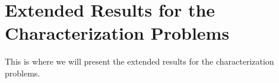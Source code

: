 \section{Extended Results for the Characterization Problems}
\label{sec:extendedcharprobs}

This is where we will present the extended results for the characterization
problems.




